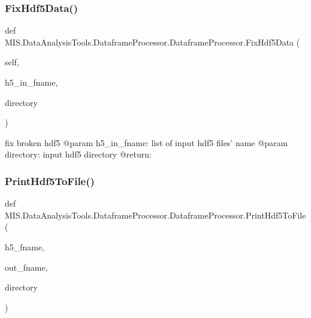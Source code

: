 \subsubsection{\texorpdfstring{Fix\+Hdf5\+Data()}{FixHdf5Data()}}
{\footnotesize\ttfamily def M\+I\+S.\+Data\+Analysis\+Tools.\+Dataframe\+Processor.\+Dataframe\+Processor.\+Fix\+Hdf5\+Data (\begin{DoxyParamCaption}\item[{}]{self,  }\item[{}]{h5\+\_\+in\+\_\+fname,  }\item[{}]{directory }\end{DoxyParamCaption})}

\begin{DoxyVerb}fix broken hdf5
@param h5_in_fname: list of input hdf5 files' name
@param directory: input hdf5 directory
@return:
\end{DoxyVerb}
 \mbox{\label{classMIS_1_1DataAnalysisTools_1_1DataframeProcessor_1_1DataframeProcessor_ad31a267c72dbc35025fccd1c0314a997}} 
\subsubsection{\texorpdfstring{Print\+Hdf5\+To\+File()}{PrintHdf5ToFile()}}
{\footnotesize\ttfamily def M\+I\+S.\+Data\+Analysis\+Tools.\+Dataframe\+Processor.\+Dataframe\+Processor.\+Print\+Hdf5\+To\+File (\begin{DoxyParamCaption}\item[{}]{h5\+\_\+fname,  }\item[{}]{out\+\_\+fname,  }\item[{}]{directory }\end{DoxyParamCaption})\hspace{0.3cm}{\ttfamily [static]}}

